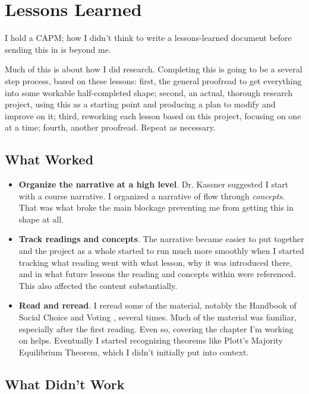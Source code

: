 \chapter{Lessons Learned}

I hold a CAPM; how I didn't think to write a lessons-learned document before sending this in is beyond me.

Much of this is about how I did research.  Completing this is going to be a several step process, based on these lessons:  first, the general proofread to get everything into some workable half-completed shape; second, an actual, thorough research project, using this as a starting point and producing a plan to modify and improve on it; third, reworking each lesson based on this project, focusing on one at a time; fourth, another proofread.  Repeat as necessary.

\section{What Worked}

\begin{itemize}
    \item \textbf{Organize the narrative at a high level}.  Dr. Kassner suggested I start with a course narrative.  I organized a narrative of flow through \textit{concepts}.  That was what broke the main blockage preventing me from getting this in shape at all.

    \item \textbf{Track readings and concepts}.  The narrative became easier to put together and the project as a whole started to run much more smoothly when I started tracking what reading went with what lesson, why it was introduced there, and in what future lessons the reading and concepts within were referenced.  This also affected the content substantially.

    \item \textbf{Read and reread}.  I reread some of the material, notably the Handbook of Social Choice and Voting \autocite{Heckelman2015}, several times.  Much of the material was familiar, especially after the first reading.  Even so, covering the chapter I'm working on helps.  Eventually I started recognizing theorems like Plott's Majority Equilibrium Theorem, which I didn't initially put into context.
\end{itemize}

\section{What Didn't Work}


